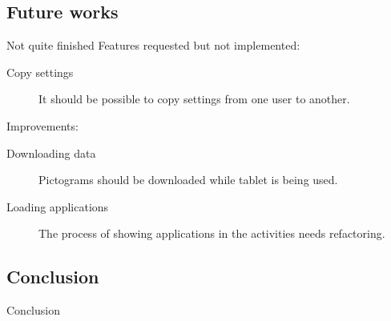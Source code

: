 \subsection{Future works}
\begin{frame}{Not quite finished}
	Features requested but not implemented:
	\begin{description}
		\item[Copy settings]{It should be possible to copy settings from one user to another.}
	\end{description}
	Improvements:
	\begin{description}
		\item[Downloading data]{Pictograms should be downloaded while tablet is being used.}
		\item[Loading applications]{The process of showing applications in the activities needs refactoring.}
	\end{description}
\end{frame}

\subsection{Conclusion}
\begin{frame}{Conclusion}
	
\end{frame}